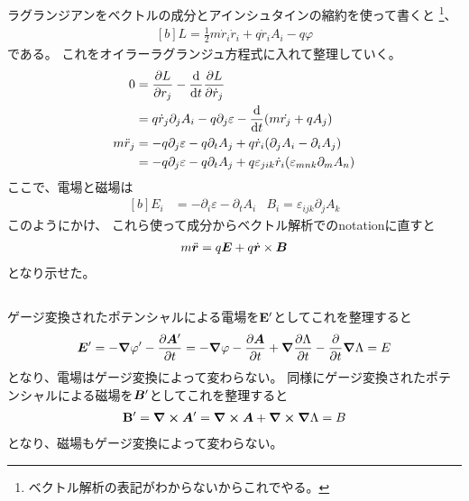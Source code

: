 \documentclass[../../master.tex]{subfiles}
\begin{document}
\subsection{}
ラグランジアンをベクトルの成分とアインシュタインの縮約を使って書くと
\footnote{ベクトル解析の表記がわからないからこれでやる。}、
\begin{equation}\begin{aligned}[b]
    L = \frac{1}{2}m \dot{r}_i \dot{r}_i + q\dot{r}_iA_i -q\varphi
\end{aligned}\end{equation}
である。
これをオイラーラグランジュ方程式に入れて整理していく。
\begin{equation}\begin{aligned}[b]
    0&=\pdv{L}{r_j}-\dv{t}\pdv{L}{\dot{r}_j}\\
    &= q \dot{r}_j \partial_j A_i - q \partial_j \varepsilon -\dv{t}\qty(
        m\dot{r_j}+qA_j)\\
    m\ddot{r}_j &= -q\partial_j\varepsilon-q\partial_t A_j + q\dot{r}_i\qty(\partial_jA_i-\partial_i A_j)\\
    &= -q\partial_j\varepsilon-q\partial_t A_j + q\varepsilon_{jik}\dot{r}_i\qty(\varepsilon_{mnk}\partial_mA_n)
\end{aligned}\end{equation}
ここで、電場と磁場は
\begin{equation}\begin{aligned}[b]
    E_i &= -\partial_i \varepsilon - \partial_t A_i & B_i = \varepsilon_{ijk}\partial_j A_k
\end{aligned}\end{equation}
このようにかけ、
これら使って成分からベクトル解析でのnotationに直すと
\begin{equation}\begin{aligned}[b]
    m\ddot{\vb*{r}} = q \vb*{E} +q\dot{\vb*{r}}\times \vb*{B}
\end{aligned}\end{equation}
となり示せた。

\subsection{}
ゲージ変換されたポテンシャルによる電場を\(\vb{E}'\)としてこれを整理すると
\begin{equation}\begin{aligned}[b]
    \vb*{E}' = -\grad \varphi' - \pdv{\vb*{A}'}{t}
    = -\grad \varphi - \pdv{\vb*{A}}{t} + \grad{\pdv{\Lambda}{t}}-\pdv{t}\grad{\Lambda}
    = E
\end{aligned}\end{equation}
となり、電場はゲージ変換によって変わらない。
同様にゲージ変換されたポテンシャルによる磁場を\(\vb*{B}'\)としてこれを整理すると
\begin{equation}\begin{aligned}[b]
    \vb{B}' = \curl{\vb*{A}'} = \curl{\vb*{A}} + \curl{\grad{\Lambda}} = B
\end{aligned}\end{equation}
となり、磁場もゲージ変換によって変わらない。
\end{document}
